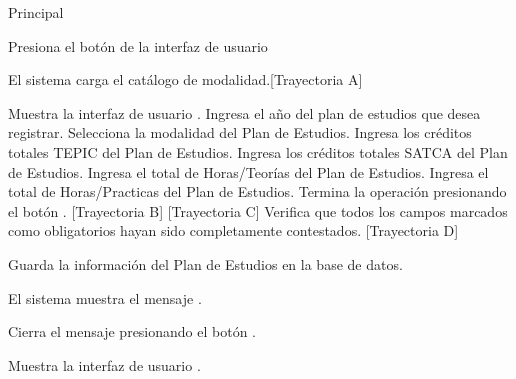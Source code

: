 \begin{UCtrayectoria}{Principal}

    \UCpaso[\UCactor] Presiona el botón  de la interfaz de usuario  
    
    \UCpaso El sistema carga el catálogo de modalidad.[Trayectoria A]


    \UCpaso Muestra la interfaz de usuario .
    \UCpaso[\UCactor] Ingresa el año del plan de estudios que desea registrar.
    \UCpaso[\UCactor] Selecciona la modalidad del Plan de Estudios.
    \UCpaso[\UCactor] Ingresa los créditos totales TEPIC del Plan de Estudios.
    \UCpaso[\UCactor] Ingresa los créditos totales SATCA del Plan de Estudios.
    \UCpaso[\UCactor] Ingresa el total de Horas/Teorías del Plan de Estudios.
    \UCpaso[\UCactor] Ingresa el total de Horas/Practicas del Plan de Estudios.
    \UCpaso[\UCactor] Termina la operación presionando el botón . [Trayectoria B] [Trayectoria C]
    \UCpaso Verifica que todos los campos marcados como obligatorios hayan sido completamente contestados. [Trayectoria D]

    \UCpaso Guarda la información del Plan de Estudios en la base de datos.

    \UCpaso El sistema muestra el mensaje .

    \UCpaso[\UCactor] Cierra el mensaje presionando el botón .

    \UCpaso Muestra la interfaz de usuario .
\end{UCtrayectoria}


\begin{comment}
\begin{UCtrayectoriaA}{A}{El sistema no encuentra ningún formulario para mostrar.}
	\UCpaso No encuentra ningún formulario para mostrar.
    \UCpaso El sistema muestra el mensaje \MSGref{MSG6}{Por el momento no se puede registrar la bibliografía}.
    \UCpaso[\UCactor] Cierra el mensaje presionando el botón \IUbutton{Aceptar}.
    \UCpaso Continua en el paso 1 de la trayectoria principal del \UCref{CU1}.
\end{UCtrayectoriaA}
\end{comment}

